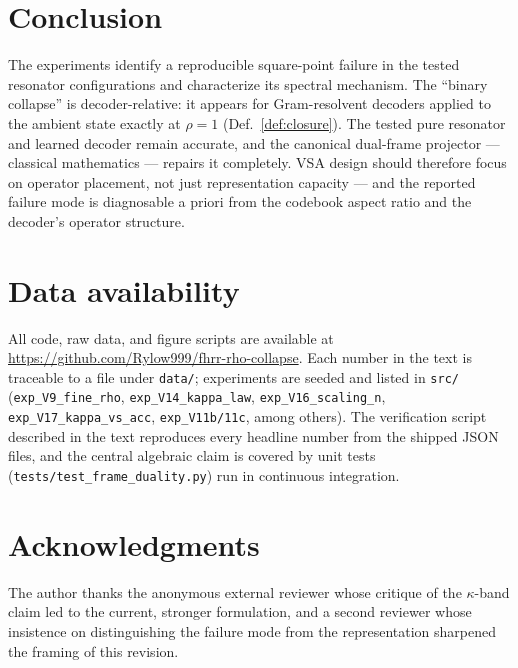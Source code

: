 \documentclass[11pt,a4paper]{article}
\begin{document}
\section{Conclusion}
\label{sec:conclusion}

The experiments identify a reproducible square-point failure in the tested resonator configurations and characterize its spectral mechanism. The ``binary collapse'' is decoder-relative: it appears for Gram-resolvent decoders applied to the ambient state exactly at $\rho=1$ (Def.~\ref{def:closure}). The tested pure resonator and learned decoder remain accurate, and the canonical dual-frame projector --- classical mathematics --- repairs it completely. VSA design should therefore focus on operator placement, not just representation capacity --- and the reported failure mode is diagnosable a priori from the codebook aspect ratio and the decoder's operator structure.

\section*{Data availability}

All code, raw data, and figure scripts are available at \url{https://github.com/Rylow999/fhrr-rho-collapse}. Each number in the text is traceable to a file under \texttt{data/}; experiments are seeded and listed in \texttt{src/} (\texttt{exp\_V9\_fine\_rho}, \texttt{exp\_V14\_kappa\_law}, \texttt{exp\_V16\_scaling\_n}, \texttt{exp\_V17\_kappa\_vs\_acc}, \texttt{exp\_V11b/11c}, among others). The verification script described in the text reproduces every headline number from the shipped JSON files, and the central algebraic claim is covered by unit tests (\texttt{tests/test\_frame\_duality.py}) run in continuous integration.

\section*{Acknowledgments}

The author thanks the anonymous external reviewer whose critique of the $\kappa$-band claim led to the current, stronger formulation, and a second reviewer whose insistence on distinguishing the failure mode from the representation sharpened the framing of this revision.



\end{document}
